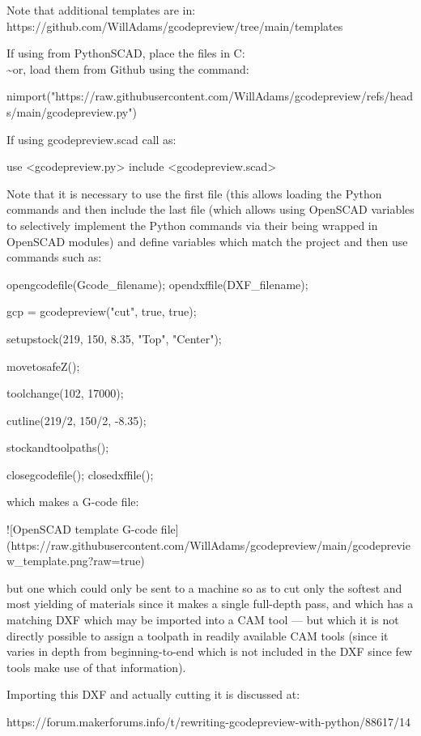 \documentclass{ltxdoc}
\begin{document}
\begin{readme}
Note that additional templates are in: https://github.com/WillAdams/gcodepreview/tree/main/templates

If using from PythonSCAD, place the files in C:\Users\\\~\Documents\OpenSCAD\libraries or, load them from Github using the command:

    nimport("https://raw.githubusercontent.com/WillAdams/gcodepreview/refs/heads/main/gcodepreview.py")

If using gcodepreview.scad call as:

    use <gcodepreview.py>
    include <gcodepreview.scad>

Note that it is necessary to use the first file (this allows loading the Python commands and then include the last file (which allows using OpenSCAD variables to selectively implement the Python commands via their being wrapped in OpenSCAD modules) and define variables which match the project and then use commands such as:

    opengcodefile(Gcode_filename);
    opendxffile(DXF_filename);
    
    gcp = gcodepreview("cut", true, true);

    setupstock(219, 150, 8.35, "Top", "Center");
    
    movetosafeZ();
    
    toolchange(102, 17000);
    
    cutline(219/2, 150/2, -8.35);

    stockandtoolpaths();
    
    closegcodefile();
    closedxffile();

which makes a G-code file:

![OpenSCAD template G-code file](https://raw.githubusercontent.com/WillAdams/gcodepreview/main/gcodepreview_template.png?raw=true)

but one which could only be sent to a machine so as to cut only the softest and most yielding of materials since it makes a single full-depth pass, and which has a matching DXF which may be imported into a CAM tool --- but which it is not directly possible to assign a toolpath in readily available CAM tools (since it varies in depth from beginning-to-end which is not included in the DXF since few tools make use of that information). 

Importing this DXF and actually cutting it is discussed at:

https://forum.makerforums.info/t/rewriting-gcodepreview-with-python/88617/14


\end{readme}
\end{document}
